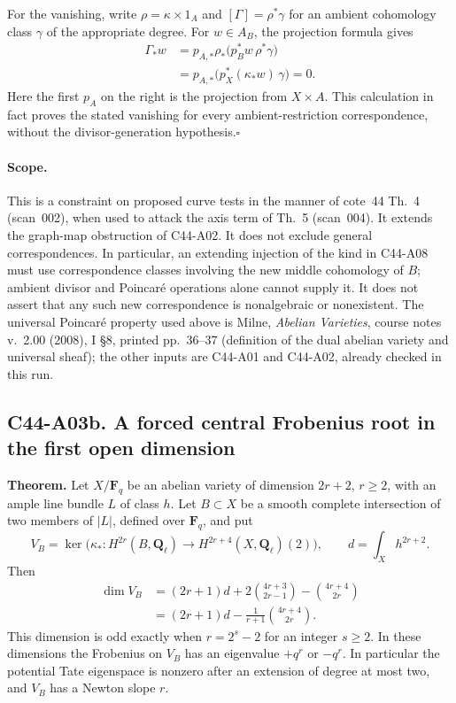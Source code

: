 \documentclass[11pt]{article}
\theoremstyle{remark}\newtheorem{remark}[theorem]{Remark}
\begin{document}
For the vanishing, write $\rho=\kappa\times1_A$ and
$[\Gamma]=\rho^*\gamma$ for an ambient cohomology class
$\gamma$ of the appropriate degree. For $w\in A_B$, the
projection formula gives
\[
 \begin{split}
 \Gamma_*w
 &=p_{A,*}\rho_*\bigl(p_B^*w\,\rho^*\gamma\bigr)\\
 &=p_{A,*}\bigl(p_X^*(\kappa_*w)\,\gamma\bigr)=0.
 \end{split}
\]
Here the first $p_A$ on the right is the projection from
$X\times A$. This calculation in fact proves the stated
vanishing for every ambient-restriction correspondence, without
the divisor-generation hypothesis.\hfill$\square$

\paragraph{Scope.}
This is a constraint on proposed curve tests in the manner of
cote~44 Th.~4 (scan~002), when used to attack the axis term of
Th.~5 (scan~004). It extends the graph-map obstruction of
C44-A02. It does not exclude general correspondences. In
particular, an extending injection of the kind in C44-A08 must
use correspondence classes involving the new middle
cohomology of $B$; ambient divisor and Poincar\'e operations
alone cannot supply it. It does not assert that any such new
correspondence is nonalgebraic or nonexistent. The universal
Poincar\'e property used above is Milne, \emph{Abelian Varieties},
course notes v.~2.00 (2008), I \S8, printed pp.~36--37
(definition of the dual abelian variety and universal sheaf);
the other inputs are C44-A01 and
C44-A02, already checked in this run.


\subsection*{C44-A03b. A forced central Frobenius root in the first open dimension}

\textbf{Theorem.}
Let $X/\mathbf F_q$ be an abelian variety of dimension $2r+2$,
$r\ge2$, with an ample line bundle $L$ of class $h$. Let
$B\subset X$ be a smooth complete intersection of two members
of $|L|$, defined over $\mathbf F_q$, and put
\[
 V_B=\ker\bigl(\kappa_*:H^{2r}(B,\mathbf Q_\ell)
       \longrightarrow H^{2r+4}(X,\mathbf Q_\ell)(2)\bigr),
 \qquad d=\int_Xh^{2r+2}.
\]
Then
\[
 \begin{split}
 \dim V_B
 &=(2r+1)d+2\binom{4r+3}{2r-1}-\binom{4r+4}{2r}\\
 &=(2r+1)d-\frac1{r+1}\binom{4r+4}{2r}.
 \end{split}
 \tag{C44.A03b.1}
\]
This dimension is odd exactly when $r=2^s-2$ for an integer
$s\ge2$. In these dimensions the Frobenius on $V_B$ has an
eigenvalue $+q^r$ or $-q^r$. In particular the potential Tate
eigenspace is nonzero after an extension of degree at most two,
and $V_B$ has a Newton slope $r$.
\end{document}
